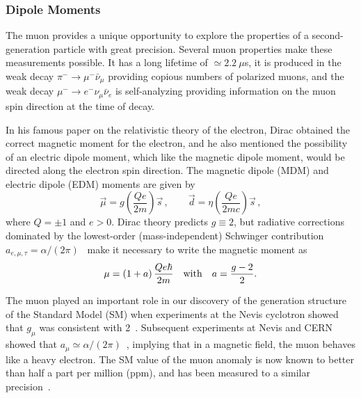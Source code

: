 

\subsubsection{Dipole Moments}
\label{cl:dipole-moments}




The muon provides a unique opportunity to explore the properties of a
second-generation particle  with great precision. Several muon properties make
these measurements possible.  It has a long
lifetime of $\simeq 2.2~\mu$s,  it is produced in the weak decay
$\pi^- \rightarrow \mu^- \bar \nu_\mu$ providing copious numbers of
polarized muons, and the weak decay
$\mu^- \rightarrow e^- \nu_\mu \bar \nu_e $ is self-analyzing providing information on the muon spin direction at the time of decay.

In his famous paper on the relativistic theory of the electron,
Dirac\cite{Dirac28} obtained the correct magnetic moment for the
electron, and he also mentioned the possibility of an electric
 dipole moment, which like the magnetic dipole moment,
would be directed along the electron spin direction.
  The magnetic dipole (MDM) and electric dipole (EDM)
moments are given by
\begin{equation}
\vec \mu = g \left( \frac{Qe}{ 2m}\right) \vec s\, , \qquad
 \vec d = \eta  \left(\frac {Qe  }{ 2
     mc}\right)
\vec s \, ,
\label{eq:MDM-EDMdef}
\end{equation}
where  $Q =  \pm 1$ and $e>0$. Dirac theory predicts $g \equiv 2$,
but radiative corrections dominated by the
lowest-order (mass-independent) Schwinger contribution $a_{e,\mu,\tau} =
 \alpha/(2\pi)$~\cite{Schwinger48} make it necessary to
write the magnetic moment as
\begin{equation}
\mu = \left(1 + a\right)\frac{Qe \hbar }{ 2m}\quad {\rm with} \quad
a = \frac{{g - 2} }{ 2}.
\label{eq:muon-MDM}
\end{equation}

The muon played an important role in our discovery of the generation
structure of the Standard Model (SM) when
 experiments at the Nevis
cyclotron
showed  that $g_\mu$ was consistent with 2~\cite{Garwin57}.
Subsequent experiments at Nevis and CERN showed  that
$a_\mu \simeq \alpha/(2\pi)$~\cite{Garwin60,Charpak61},
implying that in a magnetic field, the muon
behaves like a heavy electron.
The SM value of the muon anomaly is now known
to better than half a part per million (ppm), and has
been measured to a similar precision~\cite{Bennett06}.

